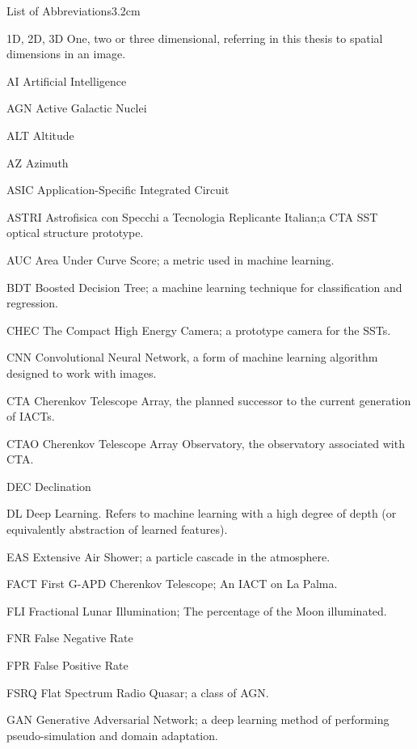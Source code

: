 \begin{mclistof}{List of Abbreviations}{3.2cm}

\item[1D, 2D, 3D] One, two or three dimensional, referring in this thesis to spatial dimensions in an image.
\item[AI] Artificial Intelligence
\item[AGN] Active Galactic Nuclei
\item[ALT] Altitude
\item[AZ] Azimuth
\item [ASIC] Application-Specific Integrated Circuit
\item[ASTRI] Astrofisica con Specchi a Tecnologia Replicante Italian;a CTA SST optical structure prototype.
\item[AUC] Area Under Curve Score; a metric used in machine learning.
\item[BDT] Boosted Decision Tree; a machine learning technique for classification and regression.
\item[CHEC] The Compact High Energy Camera; a prototype camera for the SSTs.
\item[CNN] Convolutional Neural Network, a form of machine learning algorithm designed to work with images.
\item[CTA] Cherenkov Telescope Array, the planned successor to the current generation of IACTs.
\item[CTAO] Cherenkov Telescope Array Observatory, the observatory associated with CTA.
\item[DEC] Declination
\item[DL] Deep Learning. Refers to machine learning with a high degree of depth (or equivalently abstraction of learned features).
\item[EAS] Extensive Air Shower; a particle cascade in the atmosphere.
\item[FACT] First G-APD Cherenkov Telescope; An IACT on La Palma.
\item[FLI] Fractional Lunar Illumination; The percentage of the Moon illuminated.
\item[FNR] False Negative Rate
\item[FPR] False Positive Rate
\item[FSRQ] Flat Spectrum Radio Quasar; a class of AGN.
\item[GAN] Generative Adversarial Network; a deep learning method of performing pseudo-simulation and domain adaptation.

\end{mclistof}

